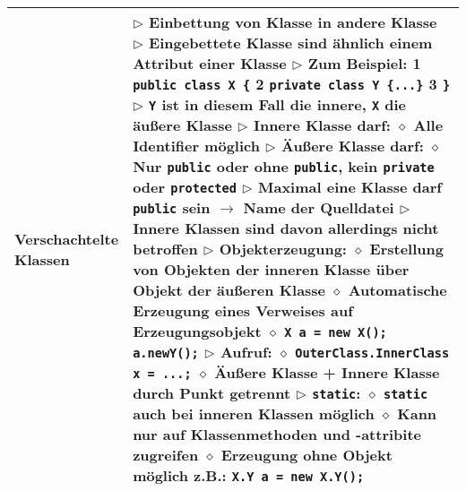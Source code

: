 \begin{longtable}{ | p{} p{} | }
	\makecell[l]{Verschachtelte \\ Klassen} & \makecell[l]{
	$\rhd$ Einbettung von Klasse in andere Klasse \\
	$\rhd$ Eingebettete Klasse sind ähnlich einem Attribut einer Klasse \\
	$\rhd$ Zum Beispiel:
	\hspace{0.4cm} 1 \hspace{0.1cm} \texttt{public class X \{} \\
	\hspace{0.4cm} 2 \hspace{0.5cm} \texttt{private class Y \{...\}} \\
	\hspace{0.4cm} 3 \hspace{0.1cm} \texttt{\}} \\
	$\rhd$ \texttt{Y} ist in diesem Fall die innere, \texttt{X} die äu\ss ere Klasse \\
	$\rhd$ Innere Klasse darf: \\
	\hspace{0.4cm} $\diamond$ Alle Identifier möglich \\
	$\rhd$ Äu\ss ere Klasse darf: \\
	\hspace{0.4cm} $\diamond$ Nur \texttt{public} oder ohne \texttt{public}, kein \texttt{private} oder \texttt{protected} \\
	$\rhd$ Maximal eine Klasse darf \texttt{public} sein $\rightarrow$ Name der Quelldatei \\
	$\rhd$ Innere Klassen sind davon allerdings nicht betroffen \\
	$\rhd$ Objekterzeugung: \\
	\hspace{0.4cm} $\diamond$ Erstellung von Objekten der inneren Klasse über Objekt der äu\ss eren Klasse \\ 
	\hspace{0.4cm} $\diamond$ Automatische Erzeugung eines Verweises auf Erzeugungsobjekt \\
	\hspace{0.4cm} $\diamond$ \texttt{X a = new X(); a.newY();} \\
	$\rhd$  Aufruf: \\
	\hspace{0.4cm} $\diamond$ \texttt{OuterClass.InnerClass x = ...;} \\
	\hspace{0.4cm} $\diamond$ Äu\ss ere Klasse + Innere Klasse durch Punkt getrennt \\
	$\rhd$ \texttt{static}: \\
	\hspace{0.4cm} $\diamond$ \texttt{static} auch bei inneren Klassen möglich \\
	\hspace{0.4cm} $\diamond$ Kann nur auf Klassenmethoden und -attribite zugreifen \\
	\hspace{0.4cm} $\diamond$ Erzeugung ohne Objekt möglich z.B.: \texttt{X.Y a = new X.Y();} } \\ \hline
	

\end{longtable}
